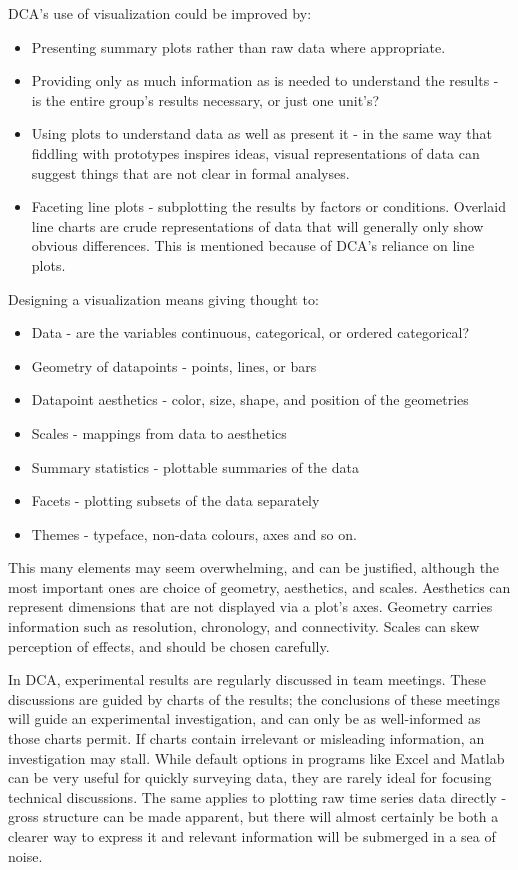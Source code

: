 \documentclass[11pt,a4paper,article]{memoir} %
\begin{document}
DCA's use of visualization could be improved by:
\begin{itemize}
\item Presenting summary plots rather than raw data where appropriate.
\item Providing only as much information as is needed to understand the results - is the entire group's results necessary, or just one unit's?
\item Using plots to understand data as well as present it - in the same way that fiddling with prototypes inspires ideas, visual representations of data can suggest things that are not clear in formal analyses.
\item Faceting line plots - subplotting the results by factors or conditions. Overlaid line charts are crude representations of data that will generally only show obvious differences. This is mentioned because of DCA's reliance on line plots.
\end{itemize}
Designing a visualization means giving thought to:
\begin{itemize}
\item Data - are the variables continuous, categorical, or ordered categorical?
\item Geometry of datapoints - points, lines, or bars
\item Datapoint aesthetics - color, size, shape, and position of the geometries
\item Scales - mappings from data to aesthetics
\item Summary statistics - plottable summaries of the data
\item Facets - plotting subsets of the data separately
\item Themes - typeface, non-data colours, axes and so on.
\end{itemize}
This many elements may seem overwhelming, and can be justified, although the most important ones are choice of geometry, aesthetics, and scales. Aesthetics can represent dimensions that are not displayed via a plot's axes. Geometry carries information such as resolution, chronology,  and connectivity. Scales can skew perception of effects, and should be chosen carefully.

 In DCA, experimental results are regularly discussed in team meetings. These discussions are guided by charts of the results; the conclusions of these meetings will guide an experimental investigation, and can only be as well-informed as those charts permit. If charts contain irrelevant or misleading information, an investigation may stall.
  While default options in programs like Excel and Matlab can be very useful for quickly surveying data, they are rarely ideal for focusing technical discussions. The same applies to plotting raw time series data directly - gross structure can be made apparent, but there will almost certainly be both a clearer way to express it and relevant information will be submerged in a sea of noise.
\end{document}
